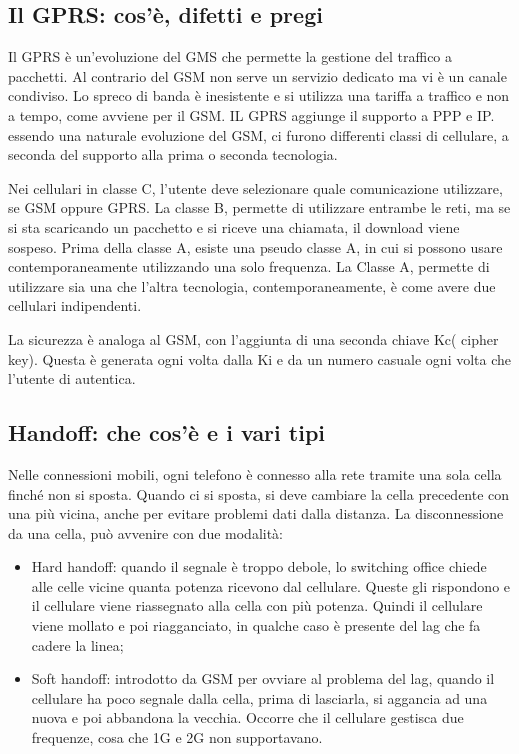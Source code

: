 \subsection{Il GPRS: cos'è, difetti e pregi}

Il GPRS è un'evoluzione del GMS che permette la gestione del traffico a pacchetti. Al contrario del
GSM non serve un servizio dedicato ma vi è un canale condiviso. Lo spreco di banda è inesistente e
si utilizza una tariffa a traffico e non a tempo, come avviene per il GSM. IL GPRS aggiunge il
supporto a PPP e IP. essendo una naturale evoluzione del GSM, ci furono differenti classi di
cellulare, a seconda del supporto alla prima o seconda tecnologia.

Nei cellulari in classe C, l'utente deve selezionare quale comunicazione utilizzare, se GSM oppure
GPRS. La classe B, permette di utilizzare entrambe le reti, ma se si sta scaricando un pacchetto e si
riceve una chiamata, il download viene sospeso. Prima della classe A, esiste una pseudo classe A, in
cui si possono usare contemporaneamente utilizzando una solo frequenza. La Classe A, permette di
utilizzare sia una che l'altra tecnologia, contemporaneamente, è come avere due cellulari
indipendenti.

La sicurezza è analoga al GSM, con l’aggiunta di una seconda chiave Kc( cipher key). Questa è
generata ogni volta dalla Ki e da un numero casuale ogni volta che l’utente di autentica.

\subsection{Handoff: che cos’è e i vari tipi}

Nelle connessioni mobili, ogni telefono è connesso alla rete tramite una sola cella finché non si
sposta. Quando ci si sposta, si deve cambiare la cella precedente con una più vicina, anche per
evitare problemi dati dalla distanza. La disconnessione da una cella, può avvenire con due modalità:

\begin{itemize}

\item Hard handoff: quando il segnale è troppo debole, lo switching office chiede alle celle vicine
quanta potenza ricevono dal cellulare. Queste gli rispondono e il cellulare viene riassegnato
alla cella con più potenza. Quindi il cellulare viene mollato e poi riagganciato, in qualche
caso è presente del lag che fa cadere la linea;
\item Soft handoff: introdotto da GSM per ovviare al problema del lag, quando il cellulare ha
poco segnale dalla cella, prima di lasciarla, si aggancia ad una nuova e poi abbandona la
vecchia. Occorre che il cellulare gestisca due frequenze, cosa che 1G e 2G non supportavano.

\end{itemize}

